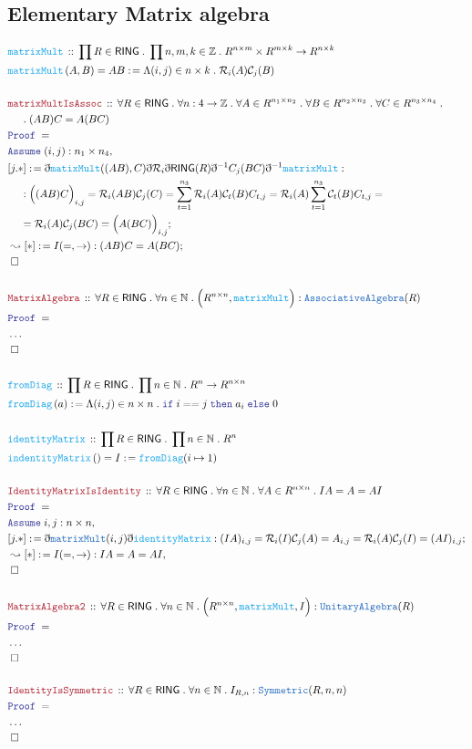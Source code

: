 \documentclass[12pt]{scrartcl}
\newcommand{\TYPE}[1]{\textcolor{NavyBlue}{\mathtt{#1}}}
\newcommand{\FUNC}[1]{\textcolor{Cerulean}{\mathtt{#1}}}
\newcommand{\LOGIC}[1]{\textcolor{Blue}{\mathtt{#1}}}
\newcommand{\THM}[1]{\textcolor{Maroon}{\mathtt{#1}}}
\renewcommand{\.}{\; . \;}
\newcommand{\de}{: \kern 0.1pc =}
\newcommand{\If}{\LOGIC{if} \;}
\newcommand{\Then}{ \; \LOGIC{then} \;}
\newcommand{\Else}{\; \LOGIC{else} \;}
\newcommand{\Act}[1]{\left(#1\right)}
\newcommand{\Theorem}[2]{& \THM{#1} \, :: \, #2 \\ & \Proof = \\ }
\newcommand{\DeclareFunc}[2]{& \FUNC{#1} \, :: \, #2 \\}
\newcommand{\DefineFunc}[3]{&  \FUNC{#1}\Act{#2} \de #3 \\}
\newcommand{\DefineNamedFunc}[4]{&  \FUNC{#1}\Act{#2} = #3 \de #4 \\}
\newcommand{\NewLine}{\\ & \kern 1pc}
\newcommand{\Page}[1]{ \begin{align*} #1 \end{align*}   }
\newcommand{ \bd }{ \ByDef }
\newcommand{\NoProof}{ & \ldots \\ \EndProof}
\newcommand{\Int}{\mathbb{Z} }
\newcommand{\Nat}{\mathbb{N} }
\newcommand{\Conclude}[3]{& #1 \de #2 : #3; \\}
\newcommand{\Derive}[3]{& \leadsto #1 \de #2 : #3, \\}
\newcommand{\DeriveConclude}[3]{& \leadsto #1 \de #2 : #3 ; \\}
\newcommand{\Assume}[2]{& \LOGIC{Assume} \; #1 : #2, \\}
\newcommand{\QED}{\; \square}
\newcommand{\EndProof}{& \QED \\}
\newcommand{\ByDef}{\eth}
\newcommand{\Proof}{\LOGIC{Proof} \; }
\newcommand{\C}{\mathcal{C}}
\newcommand{\R}{\mathcal{R}}
\newcommand{\RING}{\mathsf{RING}}
\begin{document}
\subsection{Elementary Matrix algebra}
\Page{
	\DeclareFunc{matrixMult}{\prod R \in \RING \. \prod n,m,k \in \Int \. 
		R^{n\times m}\times R^{m\times k} \to R^{n\times k}}
	\DefineNamedFunc{matrixMult}{A,B}{AB}{\Lambda (i,j) \in n \times k \. \R_i(A)\C_j(B)}
	\\
	\Theorem{matrixMultIsAssoc}{ 
		\forall R \in \RING \. 
		\forall n : 4 \to \Int \. 
		\forall A \in R^{n_1 \times n_2} \.
		\forall B \in R^{n_2 \times n_3} \.
		\forall C \in R^{n_3 \times n_4} \. \NewLine \. 
		(AB)C = A(BC)
	}
	\Assume{(i,j)}{n_1 \times n_4}
	\Conclude{[j.*]}{\bd \FUNC{matixMult}((AB),C)\bd \R_i \bd \RING(R) \bd^{-1} C_j(BC)\bd^{-1}\FUNC{matrixMult}}
	{
		\NewLine :
		\Big((AB)C\Big)_{i,j} = 
		\R_i(AB)\C_j(C) = 
		\sum^{n_3}_{t=1} \R_i(A)\C_t(B)C_{t,j} =
		\R_i(A) \sum^{n_3}_{t=1} \C_t(B)C_{t,j} = \NewLine =
		\R_i(A) \C_j(BC) =
		\Big(A(BC)\Big)_{i,j}
	}
	\DeriveConclude{[*]}{I(=,\to)}{ (AB)C = A(BC)  }
	\EndProof
	\\
	\Theorem{MatrixAlgebra}{
		\forall R \in \RING \. \forall n \in \Nat \. 
		\Big(R^{n \times n},\FUNC{matrixMult}\Big) : \TYPE{AssociativeAlgebra}(R)
	}
	\NoProof
	\\
	\DeclareFunc{fromDiag}{\prod R \in \RING \. \prod n \in \Nat \. R^n \to R^{n \times n}}
	\DefineFunc{fromDiag}{a}{\Lambda (i,j) \in n \times n \. \If i == j \Then a_i \Else 0}
	\\
	\DeclareFunc{identityMatrix}{\prod R \in \RING \. \prod n \in \Nat \. R^n }
	\DefineNamedFunc{indentityMatrix}{}{I}{\FUNC{fromDiag}(i \mapsto 1)}
	\\
	\Theorem{IdentityMatrixIsIdentity}{
		\forall R \in \RING \. \forall n \in \Nat \. \forall A \in R^{n \times n} \. 
		IA = A = AI             
	}
	\Assume{i,j}{n \times n}
	\Conclude{[j.*]}{\bd \TYPE{matrixMult}(i,j)\bd\FUNC{identityMatrix}}
	{(IA)_{i,j} = \R_i(I)\C_j(A) = A_{i,j} = \R_i(A)\C_j(I) = (AI)_{i,j}}
	\Derive{[*]}{I(=,\to)}{IA = A = AI}
	\EndProof
	\\
	\Theorem{MatrixAlgebra2}{
		\forall R \in \RING \. \forall n \in \Nat \. 
		\Big(R^{n \times n},\FUNC{matrixMult},I\Big) : \TYPE{UnitaryAlgebra}(R)
	}
	\NoProof
	\\
	\Theorem{IdentityIsSymmetric}{\forall R \in \RING \. \forall n \in \Nat \. I_{R,n} : \TYPE{Symmetric}(R,n,n)}
	\NoProof
}
\end{document}
